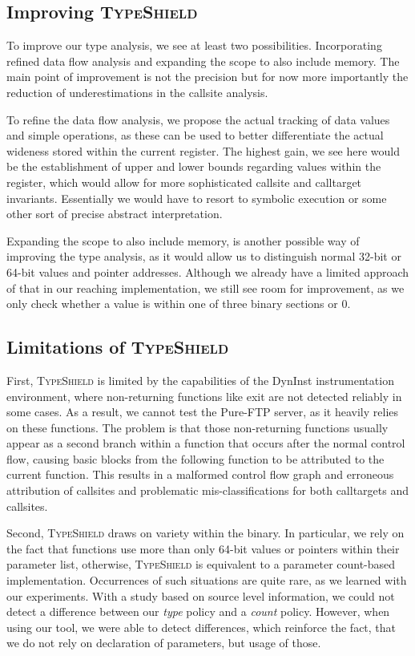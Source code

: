 \subsection{Improving \textsc{TypeShield}}
\label{section:venuesimp}
To improve our type analysis, we see at least two possibilities. Incorporating refined data flow analysis and 
expanding the scope to also include memory. The main point of improvement is not the precision but for now 
more importantly the reduction of underestimations in the callsite analysis.

To refine the data flow analysis, we propose the actual tracking of data values and simple operations, as these
can be used to better differentiate the actual wideness stored within the current register. The highest gain, 
we see here would be the establishment of upper and lower bounds regarding values within the register, which 
would allow for more sophisticated callsite and calltarget invariants. Essentially we would have to resort 
to symbolic execution or some other sort of precise abstract interpretation.

Expanding the scope to also include memory, is another possible way of improving the type analysis, as it 
would allow us to distinguish normal 32-bit or 64-bit values and pointer addresses. Although we already have a 
limited approach of that in our reaching implementation, we still see room for improvement, as we only check
whether a value is within one of three binary sections or 0.

\subsection{Limitations of \textsc{TypeShield}}
\label{section:limit}
First, \textsc{TypeShield} is limited by the capabilities of the DynInst instrumentation environment, where non-returning functions like exit are 
not detected reliably in some cases. As a result, we cannot test the Pure-FTP server, as it heavily relies on these functions. 
The problem is that those non-returning functions usually appear as a second branch within a function that occurs after the normal 
control flow, causing basic blocks from the following function to be attributed to the current function. This results in a malformed 
control flow graph and erroneous attribution of callsites and problematic mis-classifications for both calltargets and callsites.

Second, \textsc{TypeShield} draws on variety within the binary. In particular, we rely on the fact that functions use more than only 
64-bit values or pointers within their parameter list, otherwise, \textsc{TypeShield} is equivalent to a parameter count-based implementation. 
Occurrences of such situations are quite rare, as we learned with our experiments. With a study based on source level information, we could not 
detect a difference between our \textit{type} policy and a \textit{count} policy. However, when using our tool, we were able to detect differences,
which reinforce the fact, that we do not rely on declaration of parameters, but usage of those.


